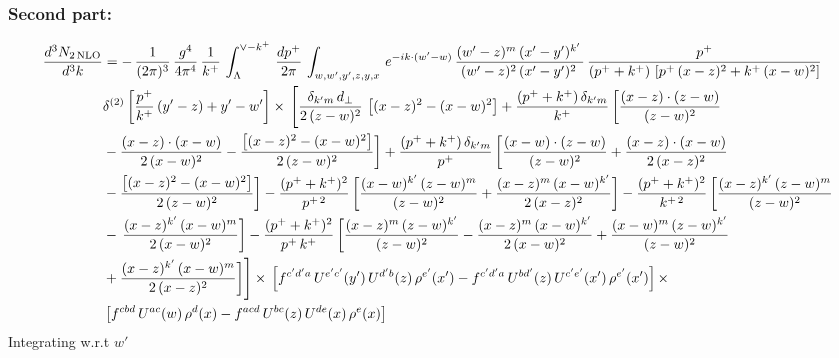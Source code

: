 \documentclass[9pt]{article}
\numberwithin{equation}{section}
\begin{document}
\subsubsection{Second part:\,}
\begin{align}
    \frac{d^{3}N_{2\,\rm NLO}}{d^{3}k} & = -\, \frac{1}{(2\pi)^{3}}\,\frac{g^{4}}{4\pi^{4}}\, \frac{1}{k^{+}}\,\int_{\Lambda}^{\vee-k^{+}}\, \frac{dp^{+}}{2\pi}\, \int_{w,w',y',z,y,x}\, e^{-ik\cdot (w'-w)}\, \frac{(w'-z)^{m}\,(x'-y')^{k'}\,}{(w'-z)^{2}\,(x'-y')^{2}\,}\, \frac{p^{+}}{(p^{+}+k^{+})\,\left[p^{+}\,(x-z)^{2}+k^{+}\,(x-w)^{2}\right]}\notag \\ & \delta^{(2)}\left[\frac{p^{+}}{k^{+}}\, (y'-z)+y'-w'\right]\times\, \Bigg[\frac{\delta_{k'm}\,d_{\perp}}{2\,(z-w)^{2}}\, \left[(x-z)^{2}-(x-w)^{2}\right]+\frac{(p^{+}+k^{+})\,\delta_{k'm}}{k^{+}}\,\bigg[\frac{(x-z)\cdot (z-w)}{(z-w)^{2}}\notag \\ & -\frac{(x-z)\cdot (x-w)}{2\,(x-w)^{2}}-\frac{\left[(x-z)^{2}-(x-w)^{2}\right]}{2\,(z-w)^{2}}\bigg]+\frac{(p^{+}+k^{+})\,\delta_{k'm}}{p^{+}}\,\bigg[\frac{(x-w)\cdot (z-w)}{(z-w)^{2}}+\frac{(x-z)\cdot (x-w)}{2\,(x-z)^{2}}\notag \\ & -\frac{\left[(x-z)^{2}-(x-w)^{2}\right]}{2\,(z-w)^{2}}\bigg]-\frac{(p^{+}+k^{+})^{2}}{p^{+\,2}}\,\bigg[\frac{(x-w)^{k'}\,(z-w)^{m}}{(z-w)^{2}}+\frac{(x-z)^{m}\,(x-w)^{k'}}{2\,(x-z)^{2}}\bigg]-\frac{(p^{+}+k^{+})^{2}}{k^{+\,2}}\,\bigg[\frac{(x-z)^{k'}\,(z-w)^{m}}{(z-w)^{2}}\notag \\ & -\,\frac{(x-z)^{k'}\,(x-w)^{m}}{2\,(x-w)^{2}}\bigg]-\frac{(p^{+}+k^{+})^{2}}{p^{+}\,k^{+}}\,\bigg[\frac{(x-z)^{m}\,(z-w)^{k'}}{(z-w)^{2}}-\frac{(x-z)^{m}\,(x-w)^{k'}}{2\,(x-w)^{2}}+\frac{(x-w)^{m}\,(z-w)^{k'}}{(z-w)^{2}}\notag \\ & +\frac{(x-z)^{k'}\,(x-w)^{m}}{2\,(x-z)^{2}}\bigg]\Bigg]\times\,\left[f^{c'd'a}\,U^{e'c'}(y')\,U^{d'b}(z)\,\rho^{e'}(x')-f^{c'd'a}\, 
    U^{bd'}(z)\,U^{c'e'}(x')\,\rho^{e'}(x')\right]\times \notag \\ & \left[f^{cbd}\,U^{ac}(w)\,\rho^{d}(x) -f^{acd}\,U^{bc}(z)\,U^{de}(x)\,\rho^{e}(x)\right]
\end{align}
Integrating w.r.t $w'$
\end{document}
